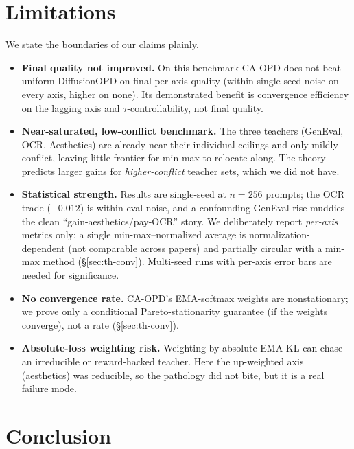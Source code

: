 \section{Limitations}
\label{sec:limitations}

We state the boundaries of our claims plainly.
\begin{itemize}
  \item \textbf{Final quality not improved.} On this benchmark CA-OPD does not
  beat uniform DiffusionOPD on final per-axis quality (within single-seed noise on
  every axis, higher on none). Its demonstrated benefit is convergence efficiency
  on the lagging axis and $\tau$-controllability, not final quality.
  \item \textbf{Near-saturated, low-conflict benchmark.} The three teachers
  (GenEval, OCR, Aesthetics) are already near their individual ceilings and only
  mildly conflict, leaving little frontier for min-max to relocate along. The
  theory predicts larger gains for \emph{higher-conflict} teacher sets, which we
  did not have.
  \item \textbf{Statistical strength.} Results are single-seed at $n{=}256$
  prompts; the OCR trade ($-0.012$) is within eval noise, and a confounding GenEval
  rise muddies the clean ``gain-aesthetics/pay-OCR'' story. We deliberately report
  \emph{per-axis} metrics only: a single min-max--normalized average is
  normalization-dependent (not comparable across papers) and partially circular
  with a min-max method (\S\ref{sec:th-conv}). Multi-seed runs with per-axis error
  bars are needed for significance.
  \item \textbf{No convergence rate.} CA-OPD's EMA-softmax weights are
  nonstationary; we prove only a conditional Pareto-stationarity guarantee (if the
  weights converge), not a rate (\S\ref{sec:th-conv}).
  \item \textbf{Absolute-loss weighting risk.} Weighting by absolute EMA-KL can
  chase an irreducible or reward-hacked teacher. Here the up-weighted axis
  (aesthetics) was reducible, so the pathology did not bite, but it is a real
  failure mode.
\end{itemize}

\section{Conclusion}
\label{sec:conclusion}

